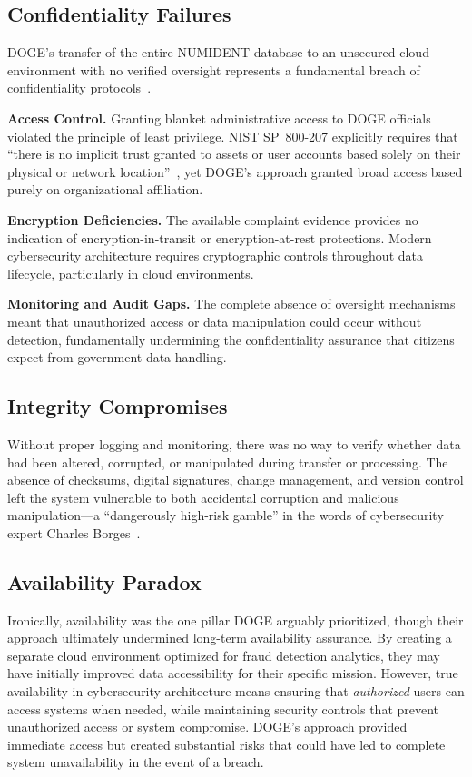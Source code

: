 \documentclass[sigconf,nonacm]{acmart}
\begin{document}
\subsection{Confidentiality Failures}

DOGE's transfer of the entire NUMIDENT database to an unsecured cloud environment with
no verified oversight represents a fundamental breach of confidentiality
protocols~\cite{nazzaro2025}.

\textbf{Access Control.} Granting blanket administrative access to DOGE officials
violated the principle of least privilege. NIST SP~800-207 explicitly requires that
``there is no implicit trust granted to assets or user accounts based solely on their
physical or network location''~\cite{nist800207}, yet DOGE's approach granted broad
access based purely on organizational affiliation.

\textbf{Encryption Deficiencies.} The available complaint evidence provides no
indication of encryption-in-transit or encryption-at-rest protections. Modern
cybersecurity architecture requires cryptographic controls throughout data lifecycle,
particularly in cloud environments.

\textbf{Monitoring and Audit Gaps.} The complete absence of oversight mechanisms meant
that unauthorized access or data manipulation could occur without detection, fundamentally
undermining the confidentiality assurance that citizens expect from government
data handling.

\subsection{Integrity Compromises}

Without proper logging and monitoring, there was no way to verify whether data had been
altered, corrupted, or manipulated during transfer or processing. The absence of
checksums, digital signatures, change management, and version control left the system
vulnerable to both accidental corruption and malicious manipulation---a ``dangerously
high-risk gamble'' in the words of cybersecurity expert Charles Borges~\cite{nazzaro2025}.

\subsection{Availability Paradox}

Ironically, availability was the one pillar DOGE arguably prioritized, though their
approach ultimately undermined long-term availability assurance. By creating a separate
cloud environment optimized for fraud detection analytics, they may have initially
improved data accessibility for their specific mission. However, true availability in
cybersecurity architecture means ensuring that \emph{authorized} users can access
systems when needed, while maintaining security controls that prevent unauthorized
access or system compromise. DOGE's approach provided immediate access but created
substantial risks that could have led to complete system unavailability in the event
of a breach.
\end{document}

